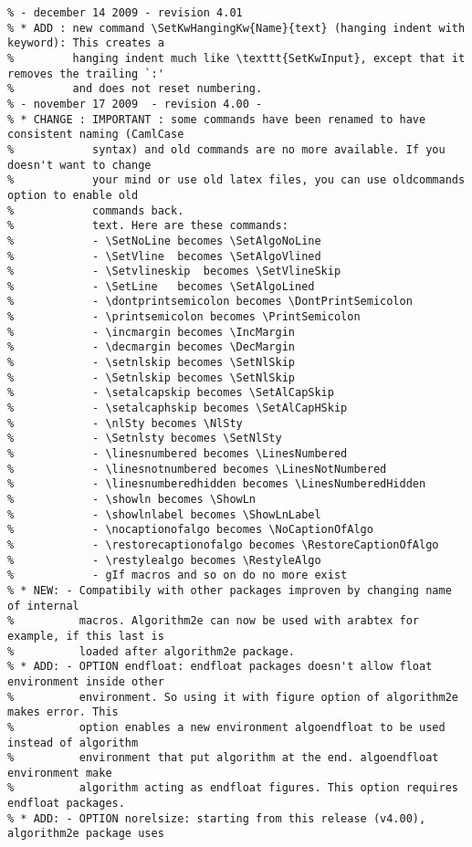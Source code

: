 \documentclass[a4paper]{article}
\begin{document}
\begin{verbatim}
% - december 14 2009 - revision 4.01
% * ADD : new command \SetKwHangingKw{Name}{text} (hanging indent with keyword): This creates a
%         hanging indent much like \texttt{SetKwInput}, except that it removes the trailing `:'
%         and does not reset numbering.
% - november 17 2009  - revision 4.00 -
% * CHANGE : IMPORTANT : some commands have been renamed to have consistent naming (CamlCase
%            syntax) and old commands are no more available. If you doesn't want to change
%            your mind or use old latex files, you can use oldcommands option to enable old
%            commands back.
%            text. Here are these commands:
%            - \SetNoLine becomes \SetAlgoNoLine
%            - \SetVline  becomes \SetAlgoVlined
%            - \Setvlineskip  becomes \SetVlineSkip
%            - \SetLine   becomes \SetAlgoLined
%            - \dontprintsemicolon becomes \DontPrintSemicolon
%            - \printsemicolon becomes \PrintSemicolon
%            - \incmargin becomes \IncMargin
%            - \decmargin becomes \DecMargin
%            - \setnlskip becomes \SetNlSkip
%            - \Setnlskip becomes \SetNlSkip
%            - \setalcapskip becomes \SetAlCapSkip
%            - \setalcaphskip becomes \SetAlCapHSkip
%            - \nlSty becomes \NlSty
%            - \Setnlsty becomes \SetNlSty
%            - \linesnumbered becomes \LinesNumbered
%            - \linesnotnumbered becomes \LinesNotNumbered
%            - \linesnumberedhidden becomes \LinesNumberedHidden
%            - \showln becomes \ShowLn
%            - \showlnlabel becomes \ShowLnLabel
%            - \nocaptionofalgo becomes \NoCaptionOfAlgo
%            - \restorecaptionofalgo becomes \RestoreCaptionOfAlgo
%            - \restylealgo becomes \RestyleAlgo
%            - gIf macros and so on do no more exist
% * NEW: - Compatibily with other packages improven by changing name of internal
%          macros. Algorithm2e can now be used with arabtex for example, if this last is
%          loaded after algorithm2e package.
% * ADD: - OPTION endfloat: endfloat packages doesn't allow float environment inside other
%          environment. So using it with figure option of algorithm2e makes error. This
%          option enables a new environment algoendfloat to be used instead of algorithm
%          environment that put algorithm at the end. algoendfloat environment make
%          algorithm acting as endfloat figures. This option requires endfloat packages.
% * ADD: - OPTION norelsize: starting from this release (v4.00), algorithm2e package uses

\end{verbatim}
\end{document}
